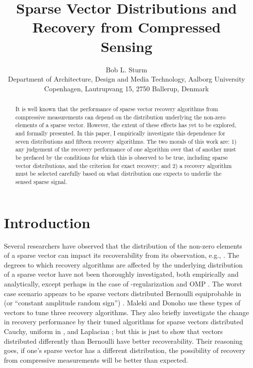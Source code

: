 \documentclass[11pt,draftcls,onecolumn]{IEEEtran}
\begin{document}
\title{Sparse Vector Distributions and Recovery from Compressed Sensing}


\author{Bob L. Sturm \\ Department of Architecture, Design and Media Technology, Aalborg University Copenhagen, 
Lautrupvang 15, 2750 Ballerup, Denmark}

\maketitle

\begin{abstract}
\noindent It is well known that the performance of sparse vector recovery algorithms from 
compressive measurements can depend on the distribution 
underlying the non-zero elements of a sparse vector.
However, the extent of these effects has yet to be explored,
and formally presented.
In this paper, I empirically investigate this dependence
for seven distributions and fifteen recovery algorithms.
The two morals of this work are: 
1) any judgement of the recovery performance of one algorithm 
over that of another must be prefaced by the conditions
for which this is observed to be true, 
including sparse vector distributions,
and the criterion for exact recovery;
and 2) a recovery algorithm must be selected carefully based on
what distribution one expects to underlie the sensed sparse signal.
\end{abstract}

\section{Introduction}
Several researchers have observed that 
the distribution of the non-zero elements of a sparse vector
can impact its recoverability from its observation, e.g., 
\cite{Tropp2004,Dai2009,Donoho2009,Maleki2010,Qui2010}.
The degrees to which recovery algorithms are affected
by the underlying distribution of a sparse vector
have not been thoroughly investigated, both empirically and analytically,
except perhaps in the case of -regularization \cite{Donoho2009}
and OMP \cite{Jin2008}.
The worst case scenario appears to be 
sparse vectors distributed Bernoulli equiprobable in 
(or ``constant amplitude random sign'') \cite{Dai2009, Maleki2010}.
Maleki and Donoho \cite{Maleki2010} use these types of vectors to
tune three recovery algorithms.
They also briefly investigate the change in 
recovery performance by their tuned algorithms
for sparse vectors distributed Cauchy, uniform in , and Laplacian \cite{Maleki2010};
but this is just to show that vectors distributed
differently than Bernoulli have better recoverability.
Their reasoning goes, if one's sparse vector has a different distribution,
the possibility of recovery from compressive measurements 
will be better than expected.
\end{document}
